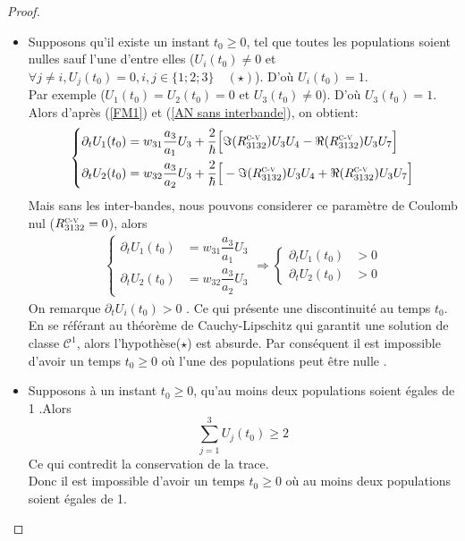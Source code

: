 \documentclass[12pt,a4paper,openany,oneside]{book}
\begin{document}
{{{{{{\begin{proof}
\begin{enumerate}
\begin{itemize}[label=$\bullet$]
\item Supposons qu'il existe un instant $t_{0}\geq 0$, tel que toutes les populations soient nulles sauf l'une d'entre elles ($ U_{i}(t_{0})\neq 0 $ et $\forall j\neq i, U_{j}(t_{0})=0 , i, j \in \{1;2;3\} \quad (\star) $). D'où $ U_{i}(t_{0})= 1 $. \\
Par exemple ($U_{1}(t_{0})=U_{2}(t_{0})=0 $ et $ U_{3}(t_{0})\neq 0 $). D'où $ U_{3}(t_{0})=1$. Alors d'après (\ref{FM1}) et (\ref{AN sans interbande}), on obtient: 
 \begin{eqnarray*}
  \left\{
\begin{split}
\partial_{t}U_{1}(t_{0}) &= w_{31}\dfrac{a_{3}}{a_{1}}U_{3} + \dfrac{2}{\hbar}\Big[\Im(R^{\textsc{c-v}}_{3132})U_{3}U_{4}-\Re(R^{\textsc{c-v}}_{3132})U_{3}U_{7}\Big]\\
\partial_{t}U_{2}(t_{0}) &= w_{32}\dfrac{a_{3}}{a_{2}}U_{3} + \dfrac{2}{\hbar}\Big[-\Im(R^{\textsc{c-v}}_{3132})U_{3}U_{4} + \Re(R^{\textsc{c-v}}_{3132})U_{3}U_{7}\Big]\\
 \end{split}  
   \right.   
  \end{eqnarray*}
  Mais sans les inter-bandes, nous pouvons considerer ce paramètre de Coulomb nul ($R^{\textsc{c-v}}_{3132}=0$), alors 
 \begin{eqnarray*}
  \left\{
\begin{split}
\partial_{t}U_{1}(t_{0}) &= w_{31}\dfrac{a_{3}}{a_{1}}U_{3}\\
\partial_{t}U_{2}(t_{0}) &= w_{32}\dfrac{a_{3}}{a_{2}}U_{3}
 \end{split}  
   \right.  \Rightarrow \left\{
 \begin{split}
 \partial_{t}U_{1}(t_{0}) & >0 \\
\partial_{t}U_{2}(t_{0}) & >0
  \end{split}  
   \right.    
\end{eqnarray*}
On remarque $\partial_{t}U_{i}(t_{0})>0 $ . Ce qui présente une discontinuité au temps $t_{0}$.\\
En se référant au théorème de Cauchy-Lipschitz qui garantit une solution de classe $\mathcal{C}^{1}$, alors l'hypothèse($\star$) est absurde. Par conséquent il est impossible d'avoir un temps $t_{0}\geq0$ où l'une des populations peut être nulle .

 \item Supposons à un instant $t_{0}\geq0$, qu'au moins deux populations soient égales de 1 .Alors 
$$ \sum_{j=1}^{3}U_{j}(t_{0})\geq 2 $$
Ce qui contredit la conservation de la trace.\\
Donc il est impossible d'avoir un temps $t_{0}\geq0$ où au moins deux populations soient égales de 1.


\end{itemize}
\end{enumerate}
\end{proof}}}}}}}
\end{document}
